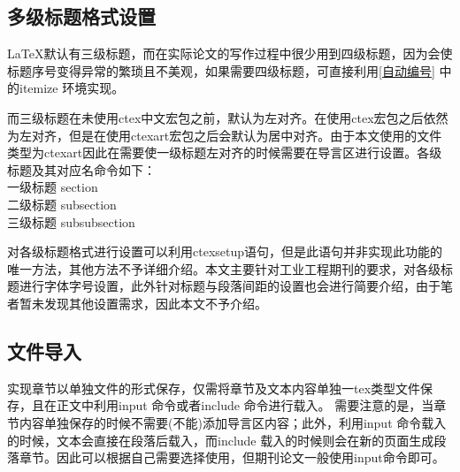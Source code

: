 \subsection{多级标题格式设置}
\LaTeX 默认有三级标题，而在实际论文的写作过程中很少用到四级标题，因为会使标题序号变得异常的繁琐且不美观，如果需要四级标题，可直接利用\ref{自动编号}%
中的itemize 环境实现。

而三级标题在未使用ctex中文宏包之前，默认为左对齐。在使用ctex宏包之后依然为左对齐，但是在使用ctexart宏包之后会默认为居中对齐。由于本文使用的文件类型为ctexart因此在需要使一级标题左对齐的时候需要在导言区进行设置。各级标题及其对应名命令如下：\\
一级标题 section\\
二级标题 subsection\\
三级标题 subsubsection

对各级标题格式进行设置可以利用ctexsetup语句，但是此语句并非实现此功能的唯一方法，其他方法不予详细介绍。本文主要针对工业工程期刊的要求，对各级标题进行字体字号设置，此外针对标题与段落间距的设置也会进行简要介绍，由于笔者暂未发现其他设置需求，因此本文不予介绍。
\subsection{文件导入}
实现章节以单独文件的形式保存，仅需将章节及文本内容单独一tex类型文件保存，且在正文中利用input 命令或者include 命令进行载入。 需要注意的是，当章节内容单独保存的时候不需要(不能)添加导言区内容；此外，利用input 命令载入的时候，文本会直接在段落后载入，而include 载入的时候则会在新的页面生成段落章节。因此可以根据自己需要选择使用，但期刊论文一般使用input命令即可。